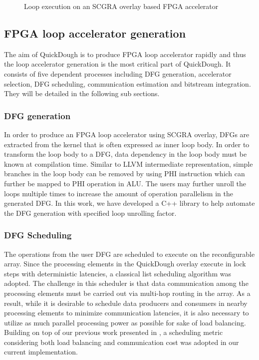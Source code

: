 \begin{figure}
\vspace{-1em}
\caption{Loop execution on an SCGRA overlay based FPGA accelerator}
\label{fig:blocking-and-dfg-gen}
\vspace{-1.2em}
\end{figure}

\subsection{FPGA loop accelerator generation}
The aim of QuickDough is to produce FPGA loop accelerator rapidly and thus the loop accelerator generation is the most critical part of QuickDough. It consists of five dependent processes including DFG generation, accelerator selection, DFG scheduling, communication estimation and bitstream integration. They will be detailed in the following sub sections.

\subsubsection{DFG generation}
In order to produce an FPGA loop accelerator using SCGRA overlay, DFGs are extracted from the kernel that is often expressed as inner loop body. In order to transform the loop body to a DFG, data dependency in the loop body must be known at compilation time. Similar to LLVM intermediate representation, simple branches in the loop body can be removed by using PHI instruction which can further be mapped to PHI operation in ALU. The users may further unroll the loops multiple times to increase the amount of operation parallelism in the generated DFG. In this work, we have developed a C++ library to help automate the DFG generation with specified loop unrolling factor.

\subsubsection{DFG Scheduling}
The operations from the user DFG are scheduled to execute on the reconfigurable array. Since the processing elements in the QuickDough overlay execute in lock steps with deterministic latencies, a classical list scheduling algorithm \cite{schutten1996list} was adopted. The challenge in this scheduler is that data communication among the processing elements must be carried out via multi-hop routing in the array. As a result, while it is desirable to schedule data producers and consumers in nearby processing elements to minimize communication latencies, it is also necessary to utilize as much parallel processing power as possible for sake of load balancing. Building on top of our previous work presented in \cite{lin2012energy}, a scheduling metric considering both load balancing and communication cost was adopted in our current implementation.

